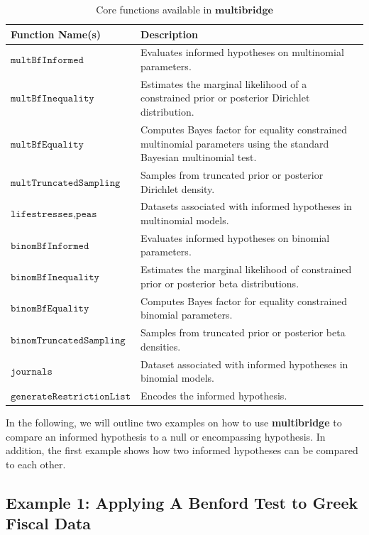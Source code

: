 \documentclass[
  english,
  man,floatsintext]{apa6}
\begin{document}
\begin{table}
\caption {Core functions available in $\textbf{multibridge}$}
\label{table:core_functions}
\begin{center}
\begin{tabular}{p{5cm}p{11cm}}
        \toprule
Function Name(s) & Description \\\midrule
$\texttt{multBfInformed}$ & Evaluates informed hypotheses on multinomial parameters.  \\
$\texttt{multBfInequality}$ & Estimates the marginal likelihood of a constrained prior or posterior Dirichlet distribution.  \\
$\texttt{multBfEquality}$ & Computes Bayes factor for equality constrained multinomial parameters using the standard Bayesian multinomial test.  \\
$\texttt{multTruncatedSampling}$ & Samples from truncated prior or posterior Dirichlet density.\\
$ \texttt{lifestresses}, \texttt{peas}$ & Datasets associated with informed hypotheses in multinomial models.\\\midrule
$\texttt{binomBfInformed}$ & Evaluates informed hypotheses on binomial parameters.  \\
$\texttt{binomBfInequality}$ & Estimates the marginal likelihood of constrained prior or posterior beta distributions.\\
$\texttt{binomBfEquality}$ & Computes Bayes factor for equality constrained binomial parameters.  \\
$\texttt{binomTruncatedSampling}$ & Samples from truncated prior or posterior beta densities.\\
$ \texttt{journals}$ & Dataset associated with informed hypotheses in binomial models.\\\midrule
$ \texttt{generateRestrictionList}$ & Encodes the informed hypothesis.\\
\bottomrule
\end{tabular}
\end{center}
\end{table}

In the following, we will outline two examples on how to use \textbf{multibridge} to compare an informed hypothesis to a null or encompassing hypothesis. In addition, the first example shows how two informed hypotheses can be compared to each other.

\hypertarget{example-1-applying-a-benford-test-to-greek-fiscal-data}{%
\subsection{Example 1: Applying A Benford Test to Greek Fiscal Data}\label{example-1-applying-a-benford-test-to-greek-fiscal-data}}
\end{document}
